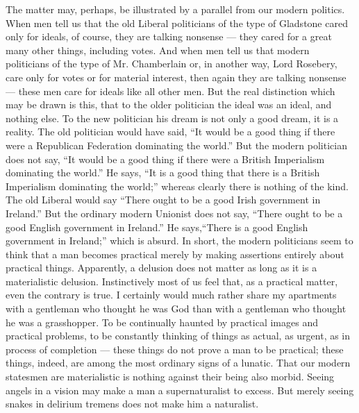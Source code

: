The matter may, perhaps, be illustrated by a parallel from our modern politics. When men tell us that the old Liberal politicians of the type of Gladstone cared only for ideals, of course, they are talking nonsense — they cared for a great many other things, including votes. And when men tell us that modern politicians of the type of Mr. Chamberlain or, in another way, Lord Rosebery, care only for votes or for material interest, then again they are talking nonsense — these men care for ideals like all other men. But the real distinction which may be drawn is this, that to the older politician the ideal was an ideal, and nothing else. To the new politician his dream is not only a good dream, it is a reality. The old politician would have said, “It would be a good thing if there were a Republican Federation dominating the world.” But the modern politician does not say, “It would be a good thing if there were a British Imperialism dominating the world.” He says, “It is a good thing that there is a British Imperialism dominating the world;” whereas clearly there is nothing of the kind. The old Liberal would say “There ought to be a good Irish government in Ireland.” But the ordinary modern Unionist does not say, “There ought to be a good English government in Ireland.” He says,“There is a good English government in Ireland;” which is absurd. In short, the modern politicians seem to think that a man becomes practical merely by making assertions entirely about practical things. Apparently, a delusion does not matter as long as it is a materialistic delusion. Instinctively most of us feel that, as a practical matter, even the contrary is true. I certainly would much rather share my apartments with a gentleman who thought he was God than with a gentleman who thought he was a grasshopper. To be continually haunted by practical images and practical problems, to be constantly thinking of things as actual, as urgent, as in process of completion — these things do not prove a man to be practical; these things, indeed, are among the most ordinary signs of a lunatic. That our modern statesmen are materialistic is nothing against their being also morbid. Seeing angels in a vision may make a man a supernaturalist to excess. But merely seeing snakes in delirium tremens does not make him a naturalist.

